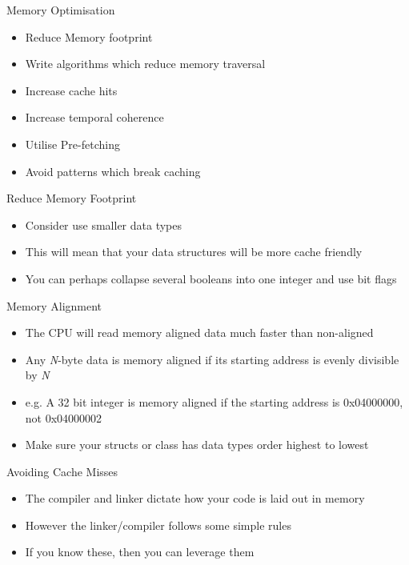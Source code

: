 \begin{frame}{Memory Optimisation}
	\begin{itemize}
		\pause \item Reduce Memory footprint
		\pause \item Write algorithms which reduce memory traversal
		\pause \item Increase cache hits
		\pause \item Increase temporal coherence
		\pause \item Utilise Pre-fetching
		\pause \item Avoid patterns which break caching 
	\end{itemize}
\end{frame}

\begin{frame}{Reduce Memory Footprint}
	\begin{itemize}
		\pause \item Consider use smaller data types
		\pause \item This will mean that your data structures will be more cache friendly
		\pause \item You can perhaps collapse several booleans into one integer and use bit flags 
	\end{itemize}
\end{frame}

\begin{frame}{Memory Alignment}
\begin{itemize}
	\pause \item The CPU will read memory aligned data much faster than non-aligned
	\pause \item Any \textit{N}-byte data is memory aligned if its starting address is evenly divisible by \textit{N}
	\pause \item e.g. A 32 bit integer is memory aligned if the starting address is 0x04000000, not 0x04000002
	\pause \item Make sure your structs or class has data types order highest to lowest  
\end{itemize}
\end{frame}

\begin{frame}{Avoiding Cache Misses}
	\begin{itemize}
		\pause \item The compiler and linker dictate how your code is laid out in memory
		\pause \item However the linker/compiler follows some simple rules
		\pause \item If you know these, then you can leverage them 
	\end{itemize}
\end{frame}

